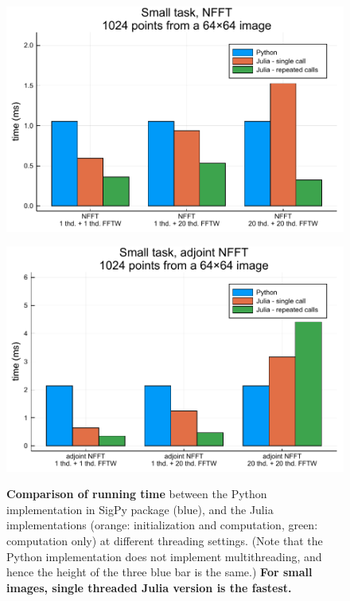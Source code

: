 \begin{figure}
    \centering
    \begin{minipage}{0.48\linewidth}
        \centering
        \includegraphics[width=\linewidth]{images/nfft_small_forw.pdf}
        \label{fig:nfft_small_forw}
    \end{minipage}
    \begin{minipage}{0.48\linewidth}
        \centering
        \includegraphics[width=\linewidth]{images/nfft_small_backw.pdf}
        \label{fig:nfft_small_backw}
    \end{minipage}
    \caption{\textbf{Comparison of running time} between the Python implementation in SigPy package (blue), and the Julia implementations (orange: initialization and computation, green: computation only) at different threading settings. (Note that the Python implementation does not implement multithreading, and hence the height of the three blue bar is the same.) \textbf{For small images, single threaded Julia version is the fastest.}}
    \label{fig:nfft_small}
\end{figure}


